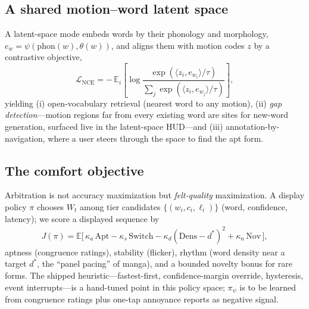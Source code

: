 \documentclass[sigconf,nonacm]{acmart}
\begin{document}
\subsection{A shared motion--word latent space}
A latent-space mode embeds words by their phonology and morphology, $e_w = \psi(\mathrm{phon}(w), \theta(w))$, and aligns them with motion codes $z$ by a contrastive objective,
\begin{equation}
\mathcal{L}_{\mathrm{NCE}} = -\,\mathbb{E}_i \left[ \log
\frac{\exp(\langle z_i, e_{w_i}\rangle / \tau)}{\sum_j \exp(\langle z_i, e_{w_j}\rangle / \tau)} \right],
\label{eq:nce}
\end{equation}
yielding (i) open-vocabulary retrieval (nearest word to any motion), (ii) \emph{gap detection}---motion regions far from every existing word are sites for new-word generation, surfaced live in the latent-space HUD---and (iii) annotation-by-navigation, where a user steers through the space to find the apt form.

\subsection{The comfort objective}
Arbitration is not accuracy maximization but \emph{felt-quality} maximization. A display policy $\pi$ chooses $W_t$ among tier candidates $\{(w_i, c_i, \ell_i)\}$ (word, confidence, latency); we score a displayed sequence by
\begin{align}
J(\pi) = \mathbb{E}\bigl[\, \kappa_a \,\mathrm{Apt} - \kappa_s\, \mathrm{Switch}
- \kappa_d (\mathrm{Dens} - d^\ast)^2
+ \kappa_n\, \mathrm{Nov} \,\bigr],
\label{eq:comfort}
\end{align}
aptness (congruence ratings), stability (flicker), rhythm (word density near a target $d^\ast$, the ``panel pacing'' of manga), and a bounded novelty bonus for rare forms. The shipped heuristic---fastest-first, confidence-margin override, hysteresis, event interrupts---is a hand-tuned point in this policy space; $\pi_\psi$ is to be learned from congruence ratings plus one-tap annoyance reports as negative signal.
\end{document}
